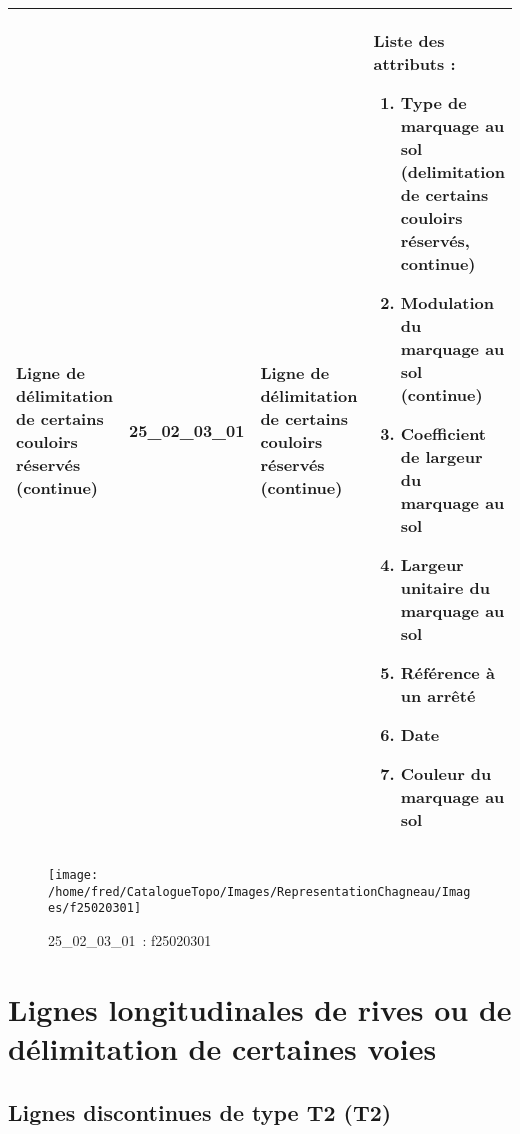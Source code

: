 \documentclass[12pt,titlepage]{book}
\begin{document}
\renewcommand{\arraystretch}{1.2}
\begin{supertabular}{|p{10cm}|c|p{13cm}|p{12cm}|}
 Ligne de délimitation de certains couloirs réservés (continue) & 25\_02\_03\_01 & Ligne de délimitation de certains couloirs réservés (continue) & Liste des attributs :
\begin{enumerate}
  \item Type de marquage au sol (delimitation de certains couloirs réservés, continue)  \item Modulation du marquage au sol (continue)  \item Coefficient de largeur du marquage au sol  \item Largeur unitaire du marquage au sol  \item Référence à un arrêté  \item Date  \item Couleur du marquage au sol\end{enumerate}
\\
\hline
\end{supertabular}
\begin{figure}[h!]
  \hfill         %
  \begin{minipage}[t]{3cm}
    \begin{center}
      \texttt{[image: /home/fred/CatalogueTopo/Images/RepresentationChagneau/Images/f25020301]}
      \caption[~25\_02\_03\_01]{\small{25\_02\_03\_01~:} \tiny{f25020301}}\label{f25020301}
    \end{center}
  \end{minipage}
\end{figure}

\section{\large Lignes longitudinales de rives ou de délimitation de certaines voies}
\subsection{Lignes discontinues de type T2 (T2)}
\noindent
\vspace{\baselineskip}
\end{document}

